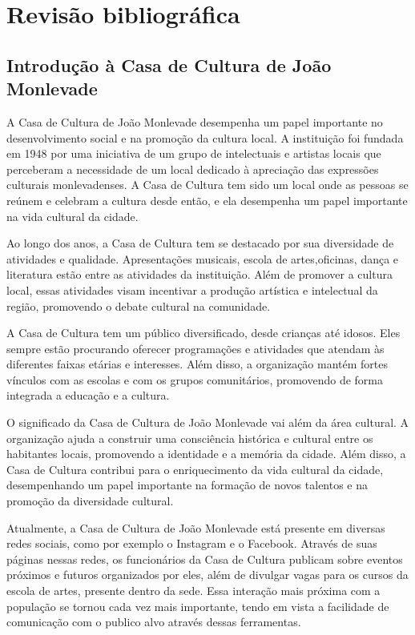 \chapter{Revisão bibliográfica}
\label{cap:revisao}

\section{Introdução à Casa de Cultura de João Monlevade}
A Casa de Cultura de João Monlevade desempenha um papel importante no desenvolvimento social e na promoção da cultura local. A instituição foi fundada em 1948 por uma iniciativa de um grupo de intelectuais e artistas locais que perceberam a necessidade de um local dedicado à apreciação das expressões culturais monlevadenses. A Casa de Cultura tem sido um local onde as pessoas se reúnem e celebram a cultura desde então, e ela desempenha um papel importante na vida cultural da cidade.

Ao longo dos anos, a Casa de Cultura tem se destacado por sua diversidade de atividades e qualidade. Apresentações musicais, escola de artes,oficinas, dança e literatura estão entre as atividades da instituição. Além de promover a cultura local, essas atividades visam incentivar a produção artística e intelectual da região, promovendo o debate cultural na comunidade.

A Casa de Cultura tem um público diversificado, desde crianças até idosos. Eles sempre estão procurando oferecer programações e atividades que atendam às diferentes faixas etárias e interesses. Além disso, a organização mantém fortes vínculos com as escolas e com os grupos comunitários, promovendo de forma integrada a educação e a cultura.

O significado da Casa de Cultura de João Monlevade vai além da área cultural. A organização ajuda a construir uma consciência histórica e cultural entre os habitantes locais, promovendo a identidade e a memória da cidade. Além disso, a Casa de Cultura contribui para o enriquecimento da vida cultural da cidade, desempenhando um papel importante na formação de novos talentos e na promoção da diversidade cultural.

Atualmente, a Casa de Cultura de João Monlevade está presente em diversas redes sociais, como por exemplo o Instagram e o Facebook. Através de suas páginas nessas redes, os funcionários da Casa de Cultura publicam sobre eventos próximos e futuros organizados por eles, além de divulgar vagas para os cursos da escola de artes, presente dentro da sede. Essa interação mais próxima com a população se tornou cada vez mais importante, tendo em vista a facilidade de comunicação com o publico alvo através dessas ferramentas.

